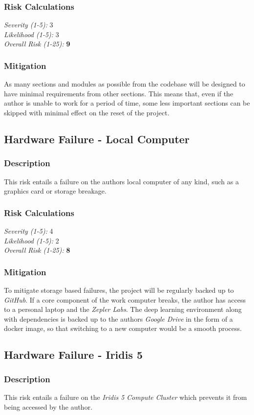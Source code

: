 \subsubsection{Risk Calculations}
\emph{Severity (1-5):} 3 \\
\emph{Likelihood (1-5):} 3 \\
\emph{Overall Risk (1-25):} \textbf{9}
\subsubsection{Mitigation}
As many sections and modules as possible from the codebase will be designed to have minimal requirements from other sections. This means that, even if the author is unable to work for a period of time, some less important sections can be skipped with minimal effect on the reset of the project.
\subsection{Hardware Failure - Local Computer}
\subsubsection{Description}
This risk entails a failure on the authors local computer of any kind, such as a graphics card or storage breakage.
\subsubsection{Risk Calculations}
\emph{Severity (1-5):} 4 \\
\emph{Likelihood (1-5):} 2 \\
\emph{Overall Risk (1-25):} \textbf{8}
\subsubsection{Mitigation}
To mitigate storage based failures, the project will be regularly backed up to \emph{GitHub}. If a core component of the work computer breaks, the author has access to a personal laptop and the \emph{Zepler Labs}. The deep learning environment along with dependencies is backed up to the authors \emph{Google Drive} in the form of a docker image, so that switching to a new computer would be a smooth process.
\subsection{Hardware Failure - Iridis 5}
\subsubsection{Description}
This risk entails a failure on the \emph{Iridis 5 Compute Cluster} which prevents it from being accessed by the author.
